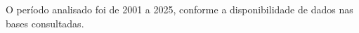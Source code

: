 O período analisado foi de 2001 a 2025, conforme a disponibilidade de dados nas bases consultadas.

